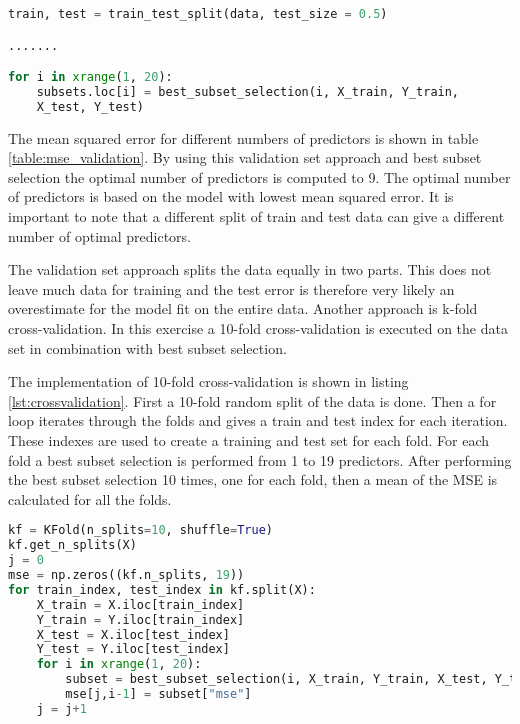 \begin{lstlisting}[language=Python, label=lst:validationsetapproach, caption=Validation set approach and best subset selection for choosing predictors]
train, test = train_test_split(data, test_size = 0.5)

.......

for i in xrange(1, 20):
	subsets.loc[i] = best_subset_selection(i, X_train, Y_train,
	X_test, Y_test)
\end{lstlisting}

The mean squared error for different numbers of predictors is shown in table \ref{table:mse_validation}. By using this validation set approach and best subset selection the optimal number of predictors is computed to 9. The optimal number of predictors is based on the model with lowest mean squared error. It is important to note that a different split of train and test data can give a different number of optimal predictors.

The validation set approach splits the data equally in two parts. This does not leave much data for training and the test error is therefore very likely an overestimate for the model fit on the entire data. Another approach is k-fold cross-validation. In this exercise a 10-fold cross-validation is executed on the data set in combination with best subset selection.

The implementation of 10-fold cross-validation is shown in listing \ref{lst:crossvalidation}. First a 10-fold random split of the data is done. Then a for loop iterates through the folds and gives a train and test index for each iteration. These indexes are used to create a training and test set for each fold. For each fold a best subset selection is performed from 1 to 19 predictors. After performing the best subset selection 10 times, one for each fold, then a mean of the MSE is calculated for all the folds.

\begin{lstlisting}[language=Python, label=lst:crossvalidation, caption=Cross-validation and best subset selection for choosing predictors]
kf = KFold(n_splits=10, shuffle=True)
kf.get_n_splits(X)
j = 0
mse = np.zeros((kf.n_splits, 19))
for train_index, test_index in kf.split(X):
    X_train = X.iloc[train_index]
    Y_train = Y.iloc[train_index]
    X_test = X.iloc[test_index]
    Y_test = Y.iloc[test_index]
    for i in xrange(1, 20):
		subset = best_subset_selection(i, X_train, Y_train, X_test, Y_test)
        mse[j,i-1] = subset["mse"]
    j = j+1  
\end{lstlisting}
\FloatBarrier

